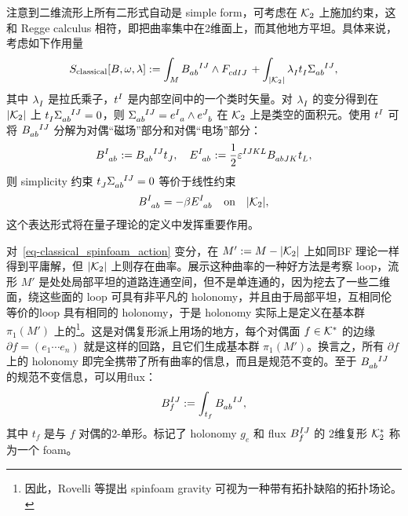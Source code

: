 			注意到二维流形上所有二形式自动是 simple form，可考虑在 $\mathcal{K}_2$ 上施加约束，这和 Regge calculus 相符，即把曲率集中在2维面上，而其他地方平坦。具体来说，考虑如下作用量
			\begin{equation}
				S_{\text{classical}}[B,\omega,\lambda] \definedby \int_{M} \tensor{B}{_a_b^I^J} \wedge \tensor{F}{_c_d_I_J} + \int_{\abs{\complex{K}_2}} \tensor{\lambda}{_I} \tensor{t}{_I} \tensor{\Sigma}{_a_b^I^J},\label{eq-classical_spinfoam_action}
			\end{equation}
			其中 $\tensor{\lambda}{_I}$ 是拉氏乘子，$\tensor{t}{^I}$ 是内部空间中的一个类时矢量。对 $\tensor{\lambda}{_I}$ 的变分得到在 $\abs{\mathcal{K}_2}$ 上 $\tensor{t}{_I} \tensor{\Sigma}{_a_b^I^J} = 0$，则 $\tensor{\Sigma}{_a_b^I^J} = \tensor{e}{^I_a} \wedge \tensor{e}{^J_b}$ 在 $\mathcal{K}_2$ 上是类空的面积元。使用 $\tensor{t}{^I}$ 可将 $\tensor{B}{_a_b^I^J}$ 分解为对偶“磁场”部分和对偶“电场”部分：
			\begin{equation}
				\tensor{B}{^I_a_b} \definedby \tensor{B}{_a_b^I^J} \tensor{t}{_J} \qc \tensor{E}{^I_a_b} \definedby \frac{1}{2} \tensor{\vol}{^I^J^K^L} \tensor{B}{_a_b_J_K} \tensor{t}{_L},
			\end{equation}
			则 simplicity 约束 $\tensor{t}{_J} \tensor{\Sigma}{_a_b^I^J} = 0$ 等价于线性约束
			\begin{equation}
				\tensor{B}{^I_a_b} = - \beta \tensor{E}{^I_a_b} \qq{on} \abs{\complex{K}_2},\label{eq-linear_constraint}
			\end{equation}
			这个表达形式将在量子理论的定义中发挥重要作用。

			对~\eqref{eq-classical_spinfoam_action} 变分，在 $M' := M- \abs{\mathcal{K}_2}$ 上如同BF 理论一样得到平庸解，但 $\abs{\mathcal{K}_2}$ 上则存在曲率。展示这种曲率的一种好方法是考察 loop，流形 $M'$ 是处处局部平坦的道路连通空间，但不是单连通的，因为挖去了一些二维面，绕这些面的 loop 可具有非平凡的 holonomy，并且由于局部平坦，互相同伦等价的loop 具有相同的 holonomy，于是 holonomy 实际上是定义在基本群 $\pi_1(M')$ 上的\footnote{因此，Rovelli 等提出 spinfoam gravity 可视为一种带有拓扑缺陷的拓扑场论\cite{Rovelli2011,Rovelli2010}。}。这是对偶复形派上用场的地方，每个对偶面 $f\in \mathcal{K}^*$ 的边缘 $\partial f = (e_1 \cdots e_n)$ 就是这样的回路，且它们生成基本群 $\pi_1(M')$。换言之，所有 $\partial f$ 上的 holonomy 即完全携带了所有曲率的信息，而且是规范不变的。至于 $\tensor{B}{_a_b^I^J}$ 的规范不变信息，可以用flux：
			\begin{equation}
				\tensor*{B}{_f^I^J} \definedby \int_{t_f} \tensor{B}{_a_b^I^J},
			\end{equation}
			其中 $t_f$ 是与 $f$ 对偶的2-单形。标记了 holonomy $g_e$ 和 flux $\tensor*{B}{_f^I^J}$ 的 2维复形 $\mathcal{K}^*_2$ 称为一个 foam。

